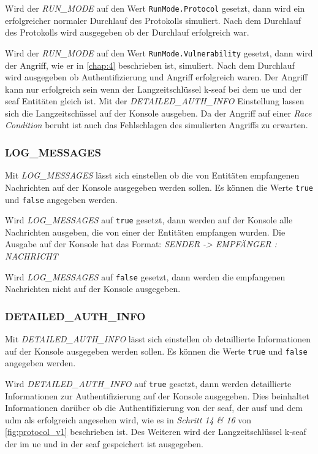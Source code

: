 Wird der \textit{RUN\_MODE} auf den Wert \lstinline{RunMode.Protocol} gesetzt, dann wird ein erfolgreicher normaler Durchlauf des Protokolls simuliert. 
Nach dem Durchlauf des Protokolls wird ausgegeben ob der Durchlauf erfolgreich war.

Wird der \textit{RUN\_MODE} auf den Wert \lstinline{RunMode.Vulnerability} gesetzt, dann wird der Angriff, wie er in \cref{chap:4} beschrieben ist, simuliert.
Nach dem Durchlauf wird ausgegeben ob Authentifizierung und Angriff erfolgreich waren.
Der Angriff kann nur erfolgreich sein wenn der Langzeitschlüssel \gls{k-seaf} bei dem \gls{ue} und der \gls{seaf} Entitäten gleich ist.
Mit der \textit{DETAILED\_AUTH\_INFO} Einstellung lassen sich die Langzeitschüssel auf der Konsole ausgeben.
Da der Angriff auf einer \textit{Race Condition} beruht ist auch das Fehlschlagen des simulierten Angriffs zu erwarten.

\subsubsection{LOG\_MESSAGES}

Mit \textit{LOG\_MESSAGES} lässt sich einstellen ob die von Entitäten empfangenen Nachrichten auf der Konsole ausgegeben werden sollen.
Es können die Werte \lstinline{true} und \lstinline{false} angegeben werden.

Wird \textit{LOG\_MESSAGES} auf \lstinline{true} gesetzt, dann werden auf der Konsole alle Nachrichten ausgeben, die von einer der Entitäten empfangen wurden.
Die Ausgabe auf der Konsole hat das Format: \textit{SENDER -> EMPFÄNGER : NACHRICHT}

Wird \textit{LOG\_MESSAGES} auf \lstinline{false} gesetzt, dann werden die empfangenen Nachrichten nicht auf der Konsole ausgegeben.

\subsubsection{DETAILED\_AUTH\_INFO}

Mit \textit{DETAILED\_AUTH\_INFO} lässt sich einstellen ob detaillierte Informationen auf der Konsole ausgegeben werden sollen.
Es können die Werte \lstinline{true} und \lstinline{false} angegeben werden.

Wird \textit{DETAILED\_AUTH\_INFO} auf \lstinline{true} gesetzt, dann werden detaillierte Informationen zur Authentifizierung auf der Konsole ausgegeben.
Dies beinhaltet Informationen darüber ob die Authentifizierung von der \gls{seaf}, der \gls{ausf} und dem \gls{udm} als erfolgreich angesehen wird, wie es in \textit{Schritt 14 \& 16} von \cref{fig:protocol_v1} beschrieben ist.
Des Weiteren wird der Langzeitschlüssel \gls{k-seaf} der im \gls{ue} und in der \gls{seaf} gespeichert ist ausgegeben.

